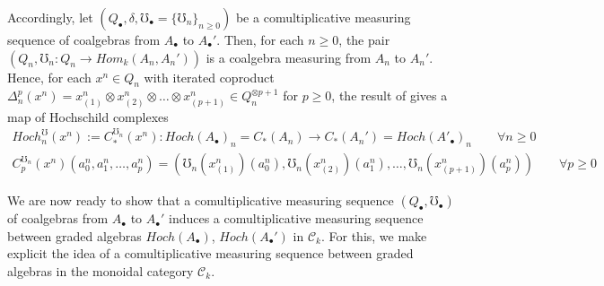 \documentclass[10pt, colorlinks]{article}
\numberwithin{equation}{section} \DeclareMathSizes{2}{10}{12}{13}
\begin{document}
       \smallskip
       Accordingly, let $(Q_\bullet,\delta,\mho_\bullet=\{\mho_n\}_{n\geq 0})$ be a comultiplicative measuring sequence of coalgebras from $A_\bullet$ to $A_\bullet'$. Then, for each $n\geq 0$, the pair $(Q_n,\mho_n: Q_n\longrightarrow Hom_k(A_n,A_n'))$ is a coalgebra measuring from $A_n$ to $A_n'$. Hence, for each $x^n\in Q_n$ with  iterated coproduct $\Delta_n^{p}(x^n)=x^n_{(1)}\otimes x^n_{(2)}\otimes\ldots\otimes x^n_{(p+1)}\in Q_n^{\otimes p+1} $ for $p\geq 0$,  the result of \cite[ Proposition  2.2]{AB2} gives a map of Hochschild complexes
        \begin{equation}\label{eq6.15.}
        \begin{array}{c}
            Hoch^\mho_{n}(x^n):=C_*^{\mho_n}(x^{n}) :Hoch(A_\bullet)_n=C_*(A_n)\longrightarrow C_*(A_n') =Hoch(A'_\bullet)_n\qquad\forall n\geq 0\\
             C_p^{\mho_n}(x^{n})(a_0^n,a^n_1,\ldots,a_p^n)=(\mho_n(x_{(1)}^{n})(a_0^n),\mho_n(x_{(2)}^{n})(a_1^n),\ldots,\mho_n(x_{(p+1)}^{n})(a_p^n)) \qquad\forall p\geq 0
        \end{array}
        \end{equation}
        
        

       We are now ready to show that a comultiplicative measuring sequence $(Q_\bullet,\mho_\bullet)$ of coalgebras from $A_\bullet$ to $A_\bullet'$ induces a comultiplicative measuring sequence between graded algebras $Hoch (A_\bullet)$,  $Hoch(A_\bullet')$ in $\mathcal C_k$. For this, we make explicit the idea of a comultiplicative measuring sequence between graded algebras in the monoidal category $\mathcal C_k$.

     
    
\end{document}
